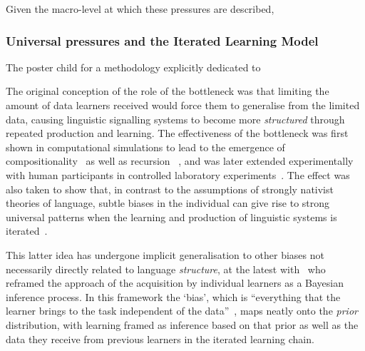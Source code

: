Given the macro-level at which these pressures are described, 



\subsubsection{Universal pressures and the Iterated Learning Model}
\label{sec:ilm}

The poster child for a methodology explicitly dedicated to 

The original conception of the role of the bottleneck was that limiting the amount of data learners received would force them to generalise from the limited data, causing linguistic signalling systems to become more \emph{structured} through repeated production and learning. The effectiveness of the bottleneck was first shown in computational simulations to lead to the emergence of compositionality~\citep{Kirby2000} as well as recursion
~\citep{Kirby2002}, and was later extended experimentally with human participants in controlled laboratory experiments~\citep[e.g.][]{Kirby2008,Cornish2009,Smith2010}.
The effect was also taken to show that, in contrast to the assumptions of strongly nativist theories of language, subtle biases in the individual can give rise to strong universal patterns when the learning and production of linguistic systems is iterated~\citep{Kirby1999}.

This latter idea has undergone implicit generalisation to other biases not necessarily directly related to language \emph{structure}, at the latest with~\citet{Kirby2004} who reframed the approach of the acquisition by individual learners as a Bayesian inference process. In this framework the `bias', which is ``everything that the learner brings to the task independent of the data''~\citep[p.590]{Kirby2004}, maps neatly onto the \emph{prior} distribution, with learning framed as inference based on that prior as well as the data they receive from previous learners in the iterated learning chain.

